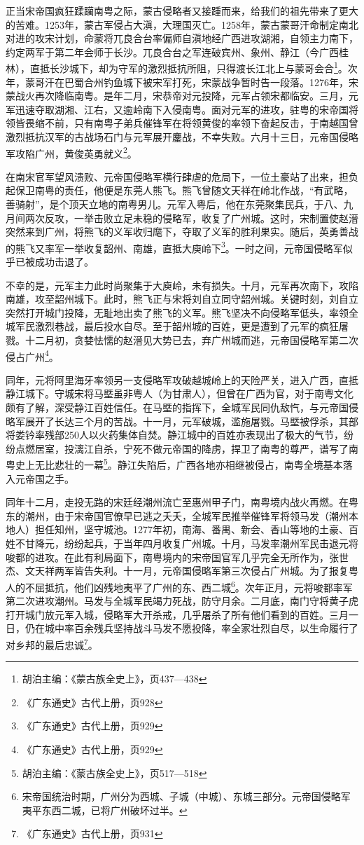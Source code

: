 正当宋帝国疯狂蹂躏南粤之际，蒙古侵略者又接踵而来，给我们的祖先带来了更大的苦难。1253年，蒙古军侵占大滇，大理国灭亡。1258年，蒙古蒙哥汗命制定南北对进的攻宋计划，命蒙将兀良合台率偏师自滇地经广西进攻湖湘，自领主力南下，约定两军于第二年会师于长沙。兀良合台之军连破宾州、象州、静江（今广西桂林），直抵长沙城下，却为守军的激烈抵抗所阻，只得渡长江北上与蒙哥会合\footnote{胡泊主编：《蒙古族全史上》，页437—438}。次年，蒙哥汗在巴蜀合州钓鱼城下被宋军打死，宋蒙战争暂时告一段落。1276年，宋蒙战火再次降临南粤。是年二月，宋恭帝对元投降，元军占领宋都临安。三月，元军迅速夺取湖湘、江右，又逾岭南下入侵南粤。面对元军的进攻，驻粤的宋帝国将领皆畏缩不前，只有南粤子弟兵催锋军在将领黄俊的率领下奋起反击，于南越国曾激烈抵抗汉军的古战场石门与元军展开鏖战，不幸失败。六月十三日，元帝国侵略军攻陷广州，黄俊英勇就义\footnote{《广东通史》古代上册，页928}。

在南宋官军望风溃败、元帝国侵略军横行肆虐的危局下，一位土豪站了出来，担负起保卫南粤的责任，他便是东莞人熊飞。熊飞曾随文天祥在岭北作战，“有武略，善骑射”，是个顶天立地的南粤男儿。元军入粤后，他在东莞聚集民兵，于八、九月间两次反攻，一举击败立足未稳的侵略军，收复了广州城。这时，宋制置使赵溍突然来到广州，将熊飞的义军收归麾下，夺取了义军的胜利果实。随后，英勇善战的熊飞又率军一举收复韶州、南雄，直抵大庾岭下\footnote{《广东通史》古代上册，页929}。一时之间，元帝国侵略军似乎已被成功击退了。

不幸的是，元军主力此时尚聚集于大庾岭，未有损失。十月，元军再次南下，攻陷南雄，攻至韶州城下。此时，熊飞正与宋将刘自立同守韶州城。关键时刻，刘自立突然打开城门投降，无耻地出卖了熊飞的义军。熊飞坚决不向侵略军低头，率领全城军民激烈巷战，最后投水自尽。至于韶州城的百姓，更是遭到了元军的疯狂屠戮。十二月初，贪婪怯懦的赵溍见大势已去，弃广州城而逃，元帝国侵略军第二次侵占广州\footnote{《广东通史》古代上册，页929}。

同年，元将阿里海牙率领另一支侵略军攻破越城岭上的天险严关，进入广西，直抵静江城下。守城宋将马塈虽非粤人（为甘肃人），但曾在广西为官，对于南粤文化颇有了解，深受静江百姓信任。在马塈的指挥下，全城军民同仇敌忾，与元帝国侵略军展开了长达三个月的苦战。十一月，元军破城，滥施屠戮。马塈被俘杀，其部将娄钤率残部250人以火药集体自焚。静江城中的百姓亦表现出了极大的气节，纷纷点燃居室，投漓江自杀，宁死不做元帝国的降虏，捍卫了南粤的尊严，谱写了南粤史上无比悲壮的一幕\footnote{胡泊主编：《蒙古族全史上》，页517—518}。静江失陷后，广西各地亦相继被侵占，南粤全境基本落入元帝国之手。

同年十二月，走投无路的宋廷经潮州流亡至惠州甲子门，南粤境内战火再燃。在粤东的潮州，由于宋帝国官僚早已逃之夭夭，全城军民推举催锋军将领马发（潮州本地人）担任知州，坚守城池。1277年初，南海、番禺、新会、香山等地的土豪、百姓不甘降元，纷纷起兵，于当年四月收复广州城。十月，马发率潮州军民击退元将唆都的进攻。在此有利局面下，南粤境内的宋帝国官军几乎完全无所作为，张世杰、文天祥两军皆告失利。十一月，元帝国侵略军第三次侵占广州城。为了报复粤人的不屈抵抗，他们凶残地夷平了广州的东、西二城\footnote{宋帝国统治时期，广州分为西城、子城（中城）、东城三部分。元帝国侵略军夷平东西二城，已将广州破坏过半。}。次年正月，元将唆都率军第二次进攻潮州。马发与全城军民竭力死战，防守月余。二月底，南门守将黄子虎打开城门放元军入城，侵略军大开杀戒，几乎屠杀了所有他们看到的百姓。三月一日，仍在城中率百余残兵坚持战斗马发不愿投降，率全家壮烈自尽，以生命履行了对乡邦的最后忠诚\footnote{《广东通史》古代上册，页931}。

